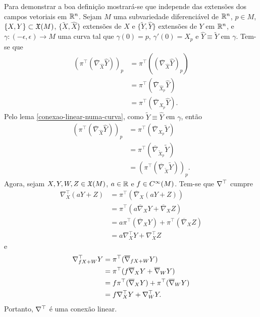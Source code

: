 \begin{demonstracao}
	Para demonstrar a boa definição mostrará-se que independe das extensões dos campos vetoriais em $\mathbb{R}^n$.
	Sejam $M$ uma subvariedade diferenciável de $\mathbb{R}^n$, $p \in M$, $\{X,Y\} \subset \mathfrak{X}(M)$, $\{ \tilde{X}, \hat{X} \}$ extensões de $X$ e $\{ \tilde{Y}, \hat{Y} \}$ extensões de $Y$ em $\mathbb{R}^n$, e $\gamma: (-\epsilon, \epsilon) \rightarrow M$ uma curva tal que $\gamma(0)=p$, $\gamma'(0)=X_p$ e $\hat{Y} \equiv \tilde{Y}$ em $\gamma$. Tem-se que
	\begin{align*}
		(\pi^\top (\overline{\nabla}_{\hat{X}} \hat{Y}))_p &= \pi^\top ((\overline{\nabla}_{\hat{X}} \hat{Y})_p)\\
		&= \pi^\top (\overline{\nabla}_{\hat{X}_p} \hat{Y})\\
		&= \pi^\top (\overline{\nabla}_{X_p} \hat{Y}).
	\end{align*}
	Pelo lema \ref{conexao-linear-numa-curva}, como $\tilde{Y} \equiv \hat{Y}$ em $\gamma$, então
	\begin{align*}
		(\pi^\top (\overline{\nabla}_{\hat{X}} \hat{Y}))_p &= \pi^\top (\overline{\nabla}_{X_p} \tilde{Y})\\
		&= \pi^\top (\overline{\nabla}_{\tilde{X}_p} \tilde{Y})\\
		&= (\pi^\top (\overline{\nabla}_{\tilde{X}} \tilde{Y}))_p.
	\end{align*}
	Agora, sejam $X,Y,W,Z \in \mathfrak{X}(M)$, $a \in \mathbb{R}$ e $f \in C^\infty(M)$. Tem-se que $\nabla^\top$ cumpre
	\begin{align*}
		\nabla^\top_X (aY + Z) &= \pi^\top (\overline{\nabla}_X (aY+Z))\\
		&= \pi^\top (a \overline{\nabla}_X Y + \overline{\nabla}_X Z)\\
		&= a \pi^\top (\overline{\nabla}_X Y) + \pi^\top (\overline{\nabla}_X Z)\\
		&= a \nabla^\top_X Y + \nabla^\top_X Z
	\end{align*}
	e
	\begin{align*}
		\nabla^\top_{fX + W} Y &= \pi^\top (\overline{\nabla}_{fX + W} Y)\\
		&= \pi^\top (f \overline{\nabla}_X Y + \overline{\nabla}_W Y)\\
		&= f \pi^\top (\overline{\nabla}_X Y) + \pi^\top (\overline{\nabla}_W Y)\\
		&= f \nabla^\top_X Y + \nabla^\top_W Y.
	\end{align*}
	Portanto, $\nabla^\top$ é uma conexão linear.
\end{demonstracao}

